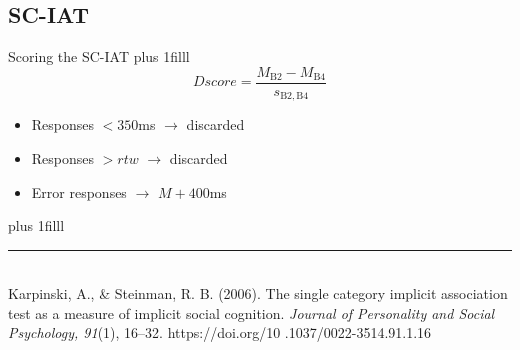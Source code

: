\documentclass{beamer}
\begin{document}
\subsection*{SC-IAT}
\begin{frame}{Scoring the SC-IAT}
	\vskip0pt plus 1filll
	\begin{equation*}
		Dscore = \frac{M_{\mathrm{B2}} - M_{\mathrm{B4}}}{s_{\mathrm{B2, B4}}}
	\end{equation*}

\vspace{5mm}

\begin{itemize}
	\item Responses $< 350$ms $ \rightarrow $ discarded
	\vspace{5mm}
	\item Responses $> rtw$ $ \rightarrow $ discarded
	\vspace{5mm}
	\item Error responses $\rightarrow$ $M + 400$ms 
\end{itemize}
\vskip0pt plus 1filll

\color{template}\rule{0.30\linewidth}{0.5pt}\\
\color{black}
\footnotesize{Karpinski, A., \& Steinman, R. B. (2006). The single
	category implicit association test as a measure of
	implicit social cognition.\emph{ Journal of Personality and
	Social Psychology, 91}(1), 16–32. https://doi.org/10
	.1037/0022-3514.91.1.16}

\end{frame}
\end{document}

